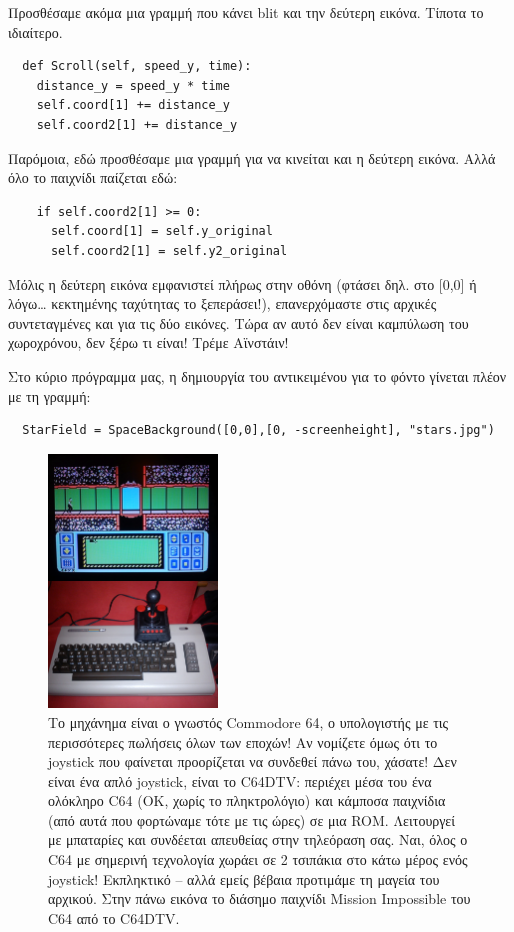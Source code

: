 Προσθέσαμε ακόμα μια γραμμή που κάνει blit και την δεύτερη εικόνα. Τίποτα το ιδιαίτερο.

\begin{verbatim}
  def Scroll(self, speed_y, time):
    distance_y = speed_y * time
    self.coord[1] += distance_y
    self.coord2[1] += distance_y
\end{verbatim}

Παρόμοια, εδώ προσθέσαμε μια γραμμή για να κινείται και η δεύτερη εικόνα. Αλλά όλο το παιχνίδι παίζεται εδώ: 

\begin{verbatim}
    if self.coord2[1] >= 0:
      self.coord[1] = self.y_original
      self.coord2[1] = self.y2_original
\end{verbatim}

Μόλις η δεύτερη εικόνα εμφανιστεί πλήρως στην οθόνη (φτάσει δηλ. στο [0,0] ή λόγω\ldots{} κεκτημένης ταχύτητας το ξεπεράσει!), επανερχόμαστε στις αρχικές συντεταγμένες και για τις δύο εικόνες. Τώρα αν αυτό δεν είναι καμπύλωση του χωροχρόνου, δεν ξέρω τι είναι! Τρέμε Αϊνστάιν!

Στο κύριο πρόγραμμα μας, η δημιουργία του αντικειμένου για το φόντο γίνεται πλέον με τη γραμμή:

\begin{verbatim}
  StarField = SpaceBackground([0,0],[0, -screenheight], "stars.jpg")
\end{verbatim}

\begin{figure}
\includegraphics[width=0.4\textwidth]{images/chapter8/c64dtv}
\caption[Commodore 64 Direct to TV]{Το μηχάνημα είναι ο γνωστός Commodore 64, ο υπολογιστής με τις περισσότερες πωλήσεις όλων των εποχών! Αν νομίζετε όμως ότι το joystick που φαίνεται προορίζεται να συνδεθεί πάνω του, χάσατε! Δεν είναι ένα απλό joystick, είναι το C64DTV: περιέχει μέσα του ένα  ολόκληρο C64 (ΟΚ, χωρίς το πληκτρολόγιο) και κάμποσα παιχνίδια (από αυτά που φορτώναμε τότε με τις ώρες) σε μια ROM. Λειτουργεί με μπαταρίες και συνδέεται απευθείας στην τηλεόραση σας. Ναι, όλος ο C64 με σημερινή τεχνολογία χωράει σε 2 τσιπάκια στο κάτω μέρος ενός joystick! Εκπληκτικό – αλλά εμείς βέβαια προτιμάμε τη μαγεία του αρχικού. Στην πάνω εικόνα το διάσημο παιχνίδι Mission Impossible του C64 από το C64DTV.}
\label{8-2}
\end{figure}
%
